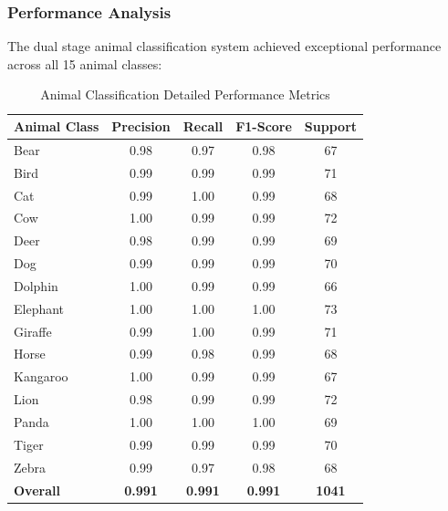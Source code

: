 \documentclass[12pt, a4paper]{article}
\begin{document}
\subsubsection{Performance Analysis}
The dual stage animal classification system achieved exceptional performance across all 15 animal classes:
\begin{table}[H]
    \centering
    \begin{tabular}{@{}lcccc@{}}
        \toprule
        Animal Class     & Precision      & Recall         & F1-Score       & Support       \\
        \midrule
        Bear             & 0.98           & 0.97           & 0.98           & 67            \\
        Bird             & 0.99           & 0.99           & 0.99           & 71            \\
        Cat              & 0.99           & 1.00           & 0.99           & 68            \\
        Cow              & 1.00           & 0.99           & 0.99           & 72            \\
        Deer             & 0.98           & 0.99           & 0.99           & 69            \\
        Dog              & 0.99           & 0.99           & 0.99           & 70            \\
        Dolphin          & 1.00           & 0.99           & 0.99           & 66            \\
        Elephant         & 1.00           & 1.00           & 1.00           & 73            \\
        Giraffe          & 0.99           & 1.00           & 0.99           & 71            \\
        Horse            & 0.99           & 0.98           & 0.99           & 68            \\
        Kangaroo         & 1.00           & 0.99           & 0.99           & 67            \\
        Lion             & 0.98           & 0.99           & 0.99           & 72            \\
        Panda            & 1.00           & 1.00           & 1.00           & 69            \\
        Tiger            & 0.99           & 0.99           & 0.99           & 70            \\
        Zebra            & 0.99           & 0.97           & 0.98           & 68            \\
        \midrule
        \textbf{Overall} & \textbf{0.991} & \textbf{0.991} & \textbf{0.991} & \textbf{1041} \\
        \bottomrule
    \end{tabular}
    \caption{Animal Classification Detailed Performance Metrics}
\end{table}
\end{document}
